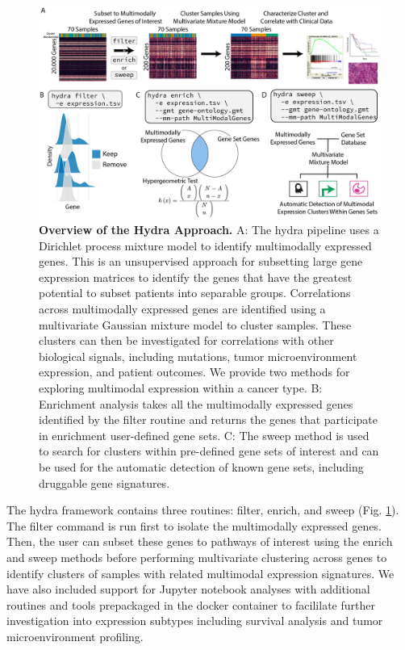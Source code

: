 \documentclass[10pt,letterpaper]{article}
\begin{document}
\begin{figure}[h!]
	\includegraphics[width=\textwidth]{"img/overview-fig"}
	\caption{{\bf Overview of the Hydra Approach.}
		A: The hydra pipeline uses a Dirichlet process mixture model to identify multimodally expressed genes. This is an unsupervised approach for subsetting large gene expression matrices to identify the genes that have the greatest potential to subset patients into separable groups. Correlations across multimodally expressed genes are identified using a multivariate Gaussian mixture model to cluster samples. These clusters can then be investigated for correlations with other biological signals, including mutations, tumor microenvironment expression, and patient outcomes. We provide two methods for exploring multimodal expression within a cancer type. B: Enrichment analysis takes all the multimodally expressed genes identified by the filter routine and returns the genes that participate in enrichment user-defined gene sets. C: The sweep method is used to search for clusters within pre-defined gene sets of interest and can be used for the automatic detection of known gene sets, including druggable gene signatures.
		\label{overview}}
\end{figure}

The hydra framework contains three routines: filter, enrich, and sweep (Fig. \ref{overview}). The filter command is run first to isolate the multimodally expressed genes. Then, the user can subset these genes to pathways of interest using the enrich and sweep methods before performing multivariate clustering across genes to identify clusters of samples with related multimodal expression signatures. We have also included support for Jupyter notebook analyses with additional routines and tools prepackaged in the docker container to facililate further investigation into expression subtypes including survival analysis and tumor microenvironment profiling.
\end{document}
